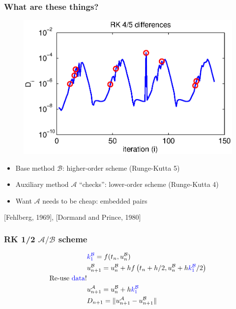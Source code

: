 \documentclass{beamer}
\newcommand{\A}{\mathcal{A}}
\newcommand{\B}{\mathcal{B}}
\begin{document}
%
\begin{frame}
\frametitle{What are these things?}

\begin{figure}
  \centering
  \includegraphics[scale=0.5]{figs/vdp2_rk.eps}
\end{figure}

\begin{itemize}
\setlength{\itemsep}{0.05in}
\item{Base method $\B$: higher-order scheme (Runge-Kutta 5)}
\pause
\item{Auxiliary method $\A$ ``checks'': lower-order scheme (Runge-Kutta 4)}
\pause
\item{Want $\A$ needs to be cheap: embedded pairs}
\end{itemize}

[Fehlberg, 1969],
[Dormand and Prince, 1980]

\end{frame}

\begin{frame}
\frametitle{RK 1/2 $\A/\B$ scheme}

\begin{align}
& \textcolor{blue}{k_1^{\B}} = f(t_n, u_n^{\B}) \nonumber \\
& u^{\B}_{n+1} = u_n^{\B} + hf\left(t_n + h/2, u_n^{\B} + h\textcolor{blue}{k_1^{\B}}/2\right) \nonumber \\
\text{Re-use \textcolor{blue}{data}!} \nonumber \\
& u_{n+1}^{\A} = u_n^{\B} + h\textcolor{blue}{k_1^{\B}} \nonumber \\
& D_{n+1} = \| u_{n+1}^{\A} - u_{n+1}^{\B} \| \nonumber
\end{align}
\end{frame}
\end{document}
